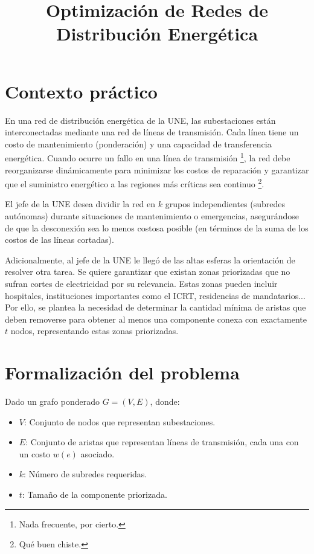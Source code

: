 \documentclass[a4paper, 12pt]{article}
\title{\textbf{Optimización de Redes de Distribución Energética}}
\author{}
\date{}
\begin{document}
\maketitle

\section*{Contexto práctico}
En una red de distribución energética de la UNE, 
las subestaciones están interconectadas mediante 
una red de líneas de transmisión. Cada línea tiene 
un costo de mantenimiento (ponderación) y una 
capacidad de transferencia energética. 
Cuando ocurre un fallo en una línea de transmisión 
\footnote{Nada frecuente, por cierto.}, 
la red debe reorganizarse dinámicamente 
para minimizar los costos de reparación y garantizar 
que el suministro energético a las regiones más 
críticas sea continuo \footnote{Qué buen chiste.}.

El jefe de la UNE desea dividir la red en \( k \) 
grupos independientes (subredes autónomas) durante 
situaciones de mantenimiento o emergencias, 
asegurándose de que la desconexión sea lo menos 
costosa posible (en términos de la suma de los 
costos de las líneas cortadas).

Adicionalmente, al jefe de la UNE le llegó de las altas esferas
la orientación de resolver otra tarea. 
Se quiere garantizar que existan zonas priorizadas que 
no sufran cortes de electricidad por su relevancia. 
Estas zonas pueden incluir hospitales, instituciones importantes como el ICRT, 
residencias de mandatarios... 
Por ello, se plantea la necesidad de determinar la 
cantidad mínima de aristas que deben removerse para 
obtener al menos una componente conexa con 
exactamente \( t \) nodos, representando estas zonas 
priorizadas.

\section*{Formalización del problema}
Dado un grafo ponderado \( G = (V, E) \), donde:
\begin{itemize}
    \item \( V \): Conjunto de nodos que representan subestaciones.
    \item \( E \): Conjunto de aristas que representan líneas de transmisión, cada una con un costo \( w(e) \) asociado.
    \item \( k \): Número de subredes requeridas.
    \item \( t \): Tamaño de la componente priorizada.
\end{itemize}
\end{document}
